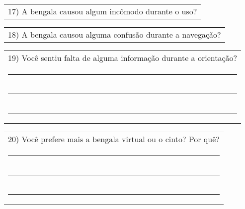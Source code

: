 \begin{table}[!thb]
    \begin{tabular}{m{1\linewidth}}
        \vspace{2ex}
        17)	A bengala causou algum incômodo durante o uso?
    \end{tabular}

    
    

    \begin{tabular}{m{1\linewidth}}
        \vspace{2ex}
        18)	A bengala causou alguma confusão durante a navegação?
    \end{tabular}

    
    

    \begin{tabular}{m{1\linewidth}}
        \vspace{2ex}
        19)	Você sentiu falta de alguma informação durante a orientação? \\


        \noindent
        \rule{6in}{.2mm} \\
        \rule{6in}{.2mm} \\
        \rule{6in}{.2mm}

    \end{tabular}
    \begin{tabular}{m{1\linewidth}}
        \vspace{2ex}
        20)	Você prefere mais a bengala virtual ou o cinto? Por quê? \\


        \noindent
        \rule{6in}{.2mm} \\
        \rule{6in}{.2mm} \\
        \rule{6in}{.2mm}


    \end{tabular}
\end{table}

\FloatBarrier

